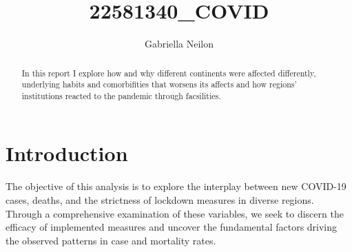 \documentclass[11pt,preprint, authoryear]{elsarticle}
\numberwithin{equation}{section}
\numberwithin{figure}{section}
\numberwithin{table}{section}
\begin{document}
\begin{frontmatter}  %

\title{22581340\_COVID}





\author[Add1]{Gabriella Neilon}





\address[Add1]{Stellenbosch University}


\begin{abstract}
\small{
In this report I explore how and why different continents were affected
differently, underlying habits and comorbifities that worsens its
affects and how regions' institutions reacted to the pandemic through
facsilities.
}
\end{abstract}

\vspace{1cm}





\vspace{0.5cm}

\end{frontmatter}

\setcounter{footnote}{0}



\pagestyle{fancy}
\chead{}
\rhead{}
\lfoot{}
\lhead{}
\cfoot{}


\headsep 35pt %




\hypertarget{introduction}{%
\section{\texorpdfstring{Introduction
\label{Introduction}}{Introduction }}\label{introduction}}

The objective of this analysis is to explore the interplay between new
COVID-19 cases, deaths, and the strictness of lockdown measures in
diverse regions. Through a comprehensive examination of these variables,
we seek to discern the efficacy of implemented measures and uncover the
fundamental factors driving the observed patterns in case and mortality
rates.
\end{document}
